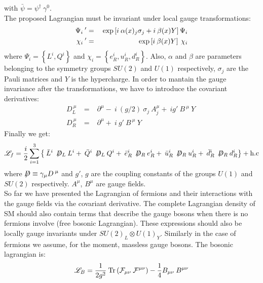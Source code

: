 with $\bar{\psi}=\psi^{\dag}\:\gamma^{0}$.\\
The proposed Lagrangian must be invariant under local gauge transformations:
\begin{eqnarray}
\Psi_{i}\:'&=&\:\hbox{exp}\left[i\:\alpha(x)_{j}\sigma_{j}+i\:\beta(x)Y\right]\Psi_{i}\nonumber\\
\chi_{i}\:'&=&\:\hbox{exp}\left[i\:\beta(x)Y\right]\:\chi_{i}  
\end{eqnarray}
where $\Psi_{i}=\left\{L^{i},Q^{i}\right\}$ and $\chi_{i}=\left\{e_{R}^{i}, u_{R}^{i}, d_{R}^{i} \right\}$. Also, 
 $\alpha$ and $\beta$ are parameters belonging to the symmetry groups $SU(2)$ and $U(1)$ respectively, $\sigma_{j}$ are the Pauli matrices and $Y$ is the hypercharge.
In order to mantain the gauge invariance after the transformations, we have to introduce the covariant derivatives:
\begin{eqnarray}
D_{L}^{\:\mu}&=&\;\partial^{\mu}-\:i\:\left(g/2\right)\:\sigma_{j}\:A^{\mu}_{j}+\:ig'\:B^{\:\mu}\:Y\;\nonumber\\
D_{R}^{\:\mu}\:&=&\;\partial^{\mu}+\:i\:g'\:B^{\:\mu}\:Y\;\:
\end{eqnarray}
Finally we get:
\begin{eqnarray}\label{leptonico}
\lagrangean_{f}=\frac{i}{2}\sum^{3}_{i=1}\left\{\:\bar{L}^{i}\:\not\!\! D_{L}\:L^{i}+\:\bar{Q}^{i}\:\not\!\! D_{L}\:Q^{i}+\:  \bar{e}_{R}^{i}\:\not\!\! D_{R}\:e_{R}^{i}+\:  \bar{u}_{R}^{i}\:\not\!\! D_{R}\:u_{R}^{i}+\:  \bar{d}_{R}^{i}\:\not\!\! D_{R}\:d_{R}^{i}\right\}+\hbox{h.c}\nonumber\\
\end{eqnarray}
where $\not\!\! D\equiv \displaystyle\gamma_{\mu}D^{\:\mu}$ and $g'$, $g$ are the coupling constants of the groups $U(1)$ and $SU(2)$ respectively. $A^{\mu}$, $B^{\mu}$ are gauge fields.\\
\indent
So far we have presented the Lagrangian of fermions and their interactions with the gauge fields via the covariant derivative. The complete Lagrangian density of SM should also contain terms that describe the gauge bosons when there is no fermions involve (free bosonic Lagrangian).
These expressions should also be locally gauge invariants under $SU(2)_{L}\otimes U(1)_{Y}$. Similarly in the case of fermions we assume, for the moment,  massless gauge bosons. The bosonic lagrangian is:
\begin{eqnarray}\label{bosott}
\mathscr{L}_{B}=\frac{1}{2g^{2}}\:\hbox{Tr} \left(\mathcal{F}_{\mu\nu}\:\mathcal{F}^{\mu\nu}\right)-\frac{1}{4}B_{\mu\nu}\:B^{\mu\nu}
\end{eqnarray}
